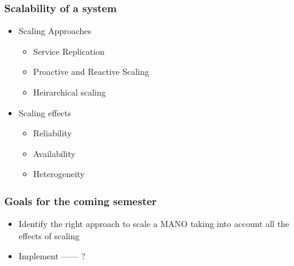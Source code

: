 \begin{frame}
\frametitle{Scalability of a system}

\begin{itemize}
	\item Scaling Approaches
			\begin{itemize}
				\item Service Replication
				\item Proactive and Reactive Scaling
				\item Heirarchical scaling
		\end{itemize}	
	\pause
	\item Scaling effects
	\begin{itemize}
		\item Reliability
		\item Availability 
		\item Heterogeneity
		
	\end{itemize}
	
\end{itemize}

\end{frame}



\begin{frame}

\frametitle{Goals for the coming semester} 

\begin{itemize}
	\item Identify the right approach to scale a MANO taking into account all the effects of scaling
	
	\item Implement ------ ?
	
\end{itemize}


\end{frame}

